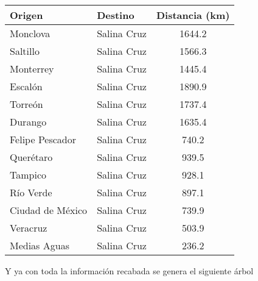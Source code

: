 \documentclass{article}
\begin{document}
\begin{enumerate}[\textbf{4.}]
  \begin{center}
    \begin{tabular}{l l c}
      \textbf{Origen} & \textbf{Destino} & \textbf{Distancia (km)} \\
      \hline 
      Monclova & Salina Cruz & 1644.2 \\[2pt] %
      Saltillo & Salina Cruz & 1566.3 \\[2pt] %
      Monterrey & Salina Cruz & 1445.4 \\[2pt] %
      Escalón & Salina Cruz & 1890.9 \\[2pt] %
      Torreón & Salina Cruz & 1737.4 \\[2pt] %
      Durango & Salina Cruz & 1635.4 \\[2pt] %
      Felipe Pescador & Salina Cruz & 740.2 \\[2pt] %
      Querétaro & Salina Cruz & 939.5 \\[2pt] %
      Tampico & Salina Cruz & 928.1 \\[2pt] %
      Río Verde & Salina Cruz & 897.1 \\[2pt] %
      Ciudad de México & Salina Cruz & 739.9 \\[2pt] %
      Veracruz & Salina Cruz & 503.9 \\[2pt] %
      Medias Aguas & Salina Cruz & 236.2 \\[2pt] %
    \end{tabular}
  \end{center}

  \vspace{3mm}
  Y ya con toda la información recabada se genera el siguiente árbol
  \begin{center}
  \end{center}

\end{enumerate}
\end{document}
